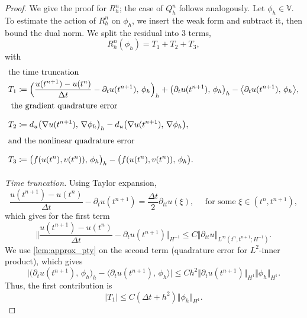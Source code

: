 \documentclass[10pt,a4paper]{amsart}
\newcommand{\VV}{\mathbb{V}}
\newcommand{\la}{\langle}
\newcommand{\ra}{\rangle}
\begin{document}
	\begin{proof}
		We give the proof for $R_h^n$; the case of $Q_h^n$ follows analogously.
		Let $\phi_h\in \VV$. To estimate the action of $R_h^n$ on $\phi_h$, we insert the weak form and subtract it, then bound the dual norm. We split the residual into 3 terms,
		\begin{equation*}
			R_h^n(\phi_h) = T_1 + T_2 + T_3,
		\end{equation*}
		with  
		\begin{align*}
			\intertext{the \textit{time truncation}}
			T_1&\coloneqq \Big( \frac{u(t^{n+1}) - u(t^n)}{\Delta t} - \partial_t u(t^{n+1}),\, \phi_h \Big)_h  +  \big(\partial_t u(t^{n+1}),\, \phi_h\big)_h - \big\la\partial_t u(t^{n+1}),\, \phi_h \big\ra,
			\\
			\intertext{  the \textit{gradient quadrature error}}
			T_2&\coloneqq d_u \big( \nabla u(t^{n+1}), \,\nabla \phi_h \big)_h- d_u \big( \nabla u(t^{n+1}), \,\nabla \phi_h \big),
			\vphantom{\Big( \frac{u(t^{n+1}) - u(t^n)}{\Delta t} - \partial_t u(t^{n+1}),\, \phi_h \Big)_h}
			\\
			\intertext{and the \textit{nonlinear quadrature error}}
			T_3&\coloneqq \big( f(u(t^n),v(t^n)), \, \phi_h \big)_h - \big(f(u(t^n),v(t^n)),\, \phi_h \big).
			\vphantom{\Big( \frac{u(t^{n+1}) - u(t^n)}{\Delta t} - \partial_t u(t^{n+1}), \,\phi_h \Big)_h}
		\end{align*}
		

		\textit{Time truncation.} 
		Using Taylor expansion,
		\begin{equation*}
			\frac{u(t^{n+1}) - u(t^n)}{\Delta t} - \partial_t u(t^{n+1})  = \frac{\Delta t}{2}\partial_{tt}u(\xi),\quad\mbox{ for some } \xi\in (t^{n}, t^{n+1}),
		\end{equation*}
		which gives for the first term
		\begin{equation*}
			\bigg\Vert \frac{u(t^{n+1}) - u(t^n)}{\Delta t} - \partial_t u(t^{n+1}) \bigg\Vert_{H^{-1}}\leq C\Vert \partial_{tt}u\Vert_{L^\infty(t^n,t^{n+1}; H^{-1})}.
		\end{equation*}
		We use \cref{lem:approx_pty} on the second term (quadrature error for $L^2$-inner product), which gives
		\begin{equation*}
			\big\vert  \big(\partial_t u(t^{n+1}),\, \phi_h\big)_h - \big\la\partial_t u(t^{n+1}),\, \phi_h \big\ra\big\vert \leq Ch^2\big\Vert \partial_t u(t^{n+1})\big\Vert_{H^1}\Vert \phi_h\Vert_{H^1}.
		\end{equation*}
		Thus, the first contribution is
		\begin{equation*}
			\vert T_1\vert\leq C(\Delta t + h^2) \Vert \phi_h\Vert_{H^1}.
		\end{equation*}
		

\end{proof}
\end{document}
